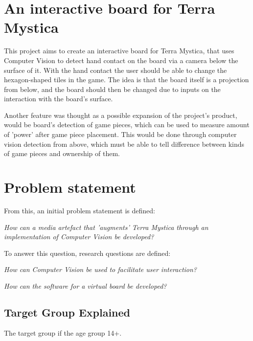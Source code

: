 \section{An interactive board for Terra Mystica}
This project aims to create an interactive board for Terra Mystica, that uses Computer Vision to detect hand contact on the board via a camera below the surface of it. With the hand contact the user should be able to change the hexagon-shaped tiles in the game. The idea is that the board itself is a projection from below, and the board should then be changed due to inputs on the interaction with the board's surface. 

Another feature was thought as a possible expansion of the project's product, would be board's detection of game pieces, which can be used to measure amount of 'power' after game piece placement. This would be done through computer vision detection from above, which must be able to tell difference between kinds of game pieces and ownership of them.

\section{Problem statement}
From this, an initial problem statement is defined: 

\textit{How can a media artefact that 'augments' Terra Mystica through an implementation of Computer Vision be developed?}

To answer this question, research questions are defined:

\textit{How can Computer Vision be used to facilitate user interaction?}

\textit{How can the software for a virtual board be developed?}

\subsection{Target Group Explained}
The target group if the age group 14+.

